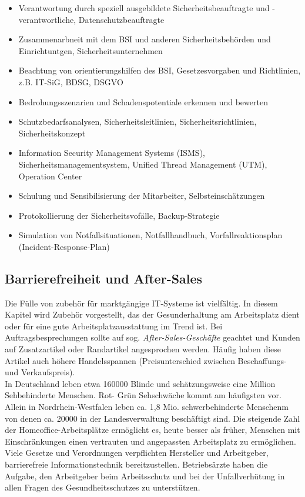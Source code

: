 \documentclass[a4paper, 12pt]{report}
\begin{document}
\begin{itemize}
    \item Verantwortung durch speziell ausgebildete Sicherheitsbeauftragte und
    -verantwortliche, Datenschutzbeauftragte
    \item Zusammenarbneit mit dem BSI und anderen Sicherheitsbehörden und
    Einrichtuntgen, Sicherheitsunternehmen
    \item Beachtung von orientierungshilfen des BSI, Gesetzesvorgaben und
    Richtlinien, z.B. IT-SiG, BDSG, DSGVO
    \item Bedrohungsszenarien und Schadenspotentiale erkennen und bewerten
    \item  Schutzbedarfsanalysen, Sicherheitsleitlinien, Sicherheitsrichtlinien,
    Sicherheitskonzept
    \item Information Security Management Systems (ISMS),
    Sicherheitsmanagementsystem, Unified Thread Management (UTM), Operation
    Center
    \item Schulung und Sensibilisierung der Mitarbeiter, Selbsteinschätzungen
    \item Protokollierung der Sicherheitsvofälle, Backup-Strategie
    \item Simulation von Notfallsituationen, Notfallhandbuch,
    Vorfallreaktionsplan (Incident-Response-Plan)
\end{itemize}

\subsection{Barrierefreiheit und After-Sales}

Die Fülle von zubehör für marktgängige IT-Systeme ist vielfältig. In diesem
Kapitel wird Zubehör vorgestellt, das der Gesunderhaltung am Arbeitsplatz dient
oder für eine gute Arbeitsplatzausstattung im Trend ist. Bei
Auftragsbesprechungen sollte auf sog. \emph{After-Sales-Geschäfte} geachtet und
Kunden auf Zusatzartikel oder Randartikel angesprochen werden. Häufig haben
diese Artikel auch höhere Handelsspannen (Preisunterschied zwischen
Beschaffungs- und Verkaufspreis). \\

In Deutschland leben etwa 160000 Blinde und schätzungsweise eine Million
Sehbehinderte Menschen. Rot- Grün Sehschwäche kommt am häufigsten vor. Allein
in Nordrhein-Westfalen leben ca. 1,8 Mio. schwerbehinderte Menschenm von denen
ca. 20000 in der Landesverwaltung beschäftigt sind. Die steigende Zahl der
Homeoffice-Arbeitsplätze  ermöglicht es, heute besser als früher, Menschen mit
Einschränkungen einen vertrauten und angepassten Arbeitsplatz zu ermöglichen.
Viele Gesetze und Verordnungen verpflichten Hersteller und Arbeitgeber,
barrierefreie Informationstechnik bereitzustellen. Betriebsärzte haben die
Aufgabe, den Arbeitgeber beim Arbeitsschutz und bei der Unfallverhütung in allen
Fragen des Gesundheitsschutzes zu unterstützen.
\end{document}
